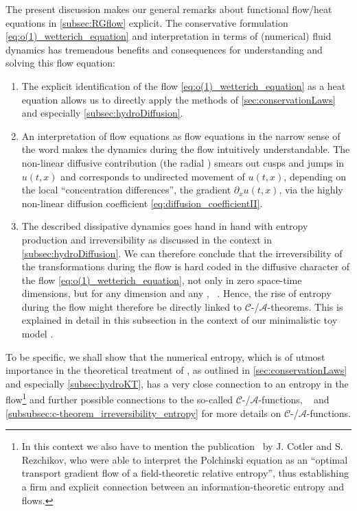The present discussion makes our general remarks about functional flow/heat equations in \cref{subsec:RGflow} explicit.
The conservative formulation \eqref{eq:o(1)_wetterich_equation} and interpretation in terms of (numerical) fluid dynamics has tremendous benefits and consequences for understanding and solving this \frg{} flow equation:
	\begin{enumerate}
		\item	The explicit identification of the \frg{} flow \cref{eq:o(1)_wetterich_equation} as a heat equation allows us to directly apply the \cfd{} methods of \cref{sec:conservationLaws} and especially \cref{subsec:hydroDiffusion}.
		\item	An interpretation of \frg{} flow equations as flow equations in the narrow sense of the word makes the dynamics during the flow intuitively understandable.
		The non-linear diffusive contribution (the radial \sigmaMode{}) smears out cusps and jumps in $u ( t, x )$ and corresponds to undirected movement of $u ( t, x )$, depending on the local ``concentration differences'', the gradient $\partial_x u ( t, x )$, via the highly non-linear diffusion coefficient \eqref{eq:diffusion_coefficientII}.
		\item The described dissipative dynamics goes hand in hand with entropy production and irreversibility as discussed in the \cfd{} context in \cref{subsec:hydroDiffusion}.
		We can therefore conclude that the irreversibility of the \rg{} transformations during the \frg{} flow is hard coded in the diffusive character of the flow \cref{eq:o(1)_wetterich_equation}, not only in zero space-time dimensions, but for any dimension and any \qft{}, \cf{}\ .
		Hence, the rise of entropy during the \frg{} flow might therefore be directly linked to $\mathcal{C}$-/$\mathcal{A}$-theorems.
		This is explained in detail in this subsection in the context of our minimalistic toy model \qft{}.
	\end{enumerate}

To be specific, we shall show that the numerical entropy, which is of utmost importance in the theoretical treatment of \pdes{}, as outlined in \cref{sec:conservationLaws} and especially \cref{subsec:hydroKT}, has a very close connection to an entropy in the \grg{} flow\footnote{In this context we also have to mention the publication~\cite{Cotler:2022fze} by J. Cotler and S. Rezchikov, who were able to interpret the Polchinski equation as an ``optimal transport gradient flow of a field-theoretic relative entropy'', thus establishing a firm and explicit connection between an information-theoretic entropy and \grg{} flows.} and further possible connections to the so-called $\mathcal{C}$-/$\mathcal{A}$-functions, \cf{}\  and \cref{subsubsec:c-theorem_irreversibility_entropy} for more details on $\mathcal{C}$-/$\mathcal{A}$-functions.

